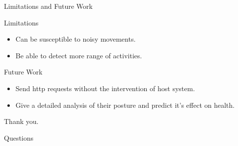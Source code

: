 \documentclass[aspectratio=169,xcolor=dvipsnames]{beamer}
\begin{document}
\begin{frame}{Limitations and Future Work}
    \begin{block}{Limitations}
        \begin{itemize}
            \item Can be susceptible to noisy movements.
            \item Be able to detect more range of activities.
        \end{itemize}
    \end{block}
    \begin{block}{Future Work}
        \begin{itemize}
            \item Send http requests without the intervention of host system.
            \item Give a detailed analysis of their posture and predict it's effect on health.
        \end{itemize}
           
    \end{block}
    
\end{frame}





\begin{frame}
    
         \Huge{\centerline{Thank you.}
         \vspace{1cm}
         \Huge{\centerline{Questions}
         }
         }
    
\end{frame}



\end{document}

